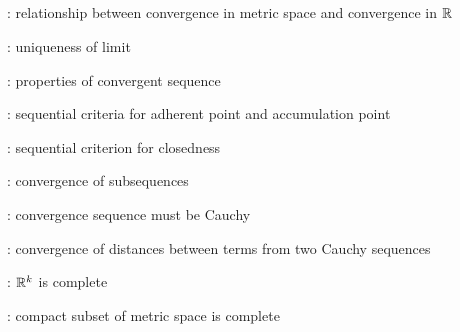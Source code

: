 \subsection*{}
\item {}: relationship between convergence in metric space and convergence in \(\mathbb{R}\)
\item {}: uniqueness of limit
\item {}: properties of convergent sequence
\item {}: sequential criteria for adherent point and accumulation point
\item {}: sequential criterion for closedness
\item {}: convergence of subsequences
\item {}: convergence sequence must be Cauchy
\item {}: convergence of distances between terms from two Cauchy sequences
\item {}: \(\mathbb{R}^k\) is complete
\item {}: compact subset of metric space is complete
